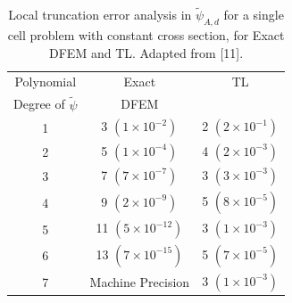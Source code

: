 \begin{table}[!htp]
\centering
\caption{Local truncation error analysis in $\widetilde{\psi}_{A,d}$ for a single cell problem with constant cross section, for Exact DFEM and TL.   Adapted from [11].}
\begin{tabular}{|c|c|c||} 
\hline
  Polynomial 										  & Exact 											& TL   \\
  Degree  of $\widetilde{\psi}$		&   DFEM											& {}	 \\
  	\hline
				1   											&  	3 $(1\times 10^{-2})$			& 2 $(2\times 10^{-1})$		 \\
		\hline
				2   											&   5 $(1\times 10^{-4})$			&  4 $(2\times 10^{-3})$	\\
		\hline	
				3   											&   7 $(7\times 10^{-7})$			& 3 $(3\times 10^{-3})$	\\
		\hline
				4   											&  9 $(2\times 10^{-9})$			& 5 $(8\times 10^{-5})$	\\
		\hline
				5   											&  11 $(5\times 10^{-12})$		& 3 $(1\times 10^{-3})$	\\
		\hline	
				6   											&  13 $(7\times 10^{-15})$		& 5 $(7\times 10^{-5})$	\\
		\hline
				7   											&  Machine Precision					& 3 $(1\times 10^{-3})$  \\
		\hline	
\end{tabular}
\label{tbl:taylor_avg_part1} 
\end{table}
